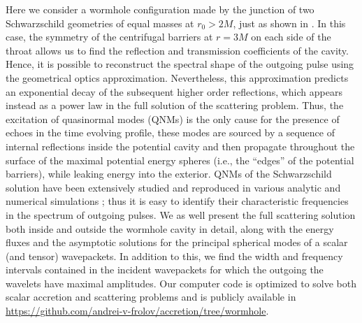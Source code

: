 \documentclass[article,aps,nofootinbib,twocolumn,superscriptaddress]{revtex4-1}
\begin{document}
Here we consider a wormhole configuration made by the junction of two Schwarzschild geometries of equal masses at $r_0>2M$, just as shown in \citep{Cardoso:2016oxy}. In this case, the symmetry of the centrifugal barriers at $r=3M$ on each side of the throat allows us to find the reflection and transmission coefficients of the cavity. Hence, it is possible to reconstruct the spectral shape of the outgoing pulse using the geometrical optics approximation. Nevertheless, this approximation predicts an exponential decay of the subsequent higher order reflections, which appears instead as a power law in the full solution of the scattering problem. Thus, the excitation of quasinormal modes (QNMs) is the only cause for the presence of echoes in the time evolving profile, these modes are sourced by a sequence of internal reflections inside the potential cavity and then propagate throughout the surface of the maximal potential energy spheres (i.e., the ``edges'' of the potential barriers), while leaking energy into the exterior. QNMs of the Schwarzschild solution have been extensively studied and reproduced in various analytic and numerical simulations \citep{Chandrasekhar:1975zza, PhysRevD.46.4179}; thus it is easy to identify their characteristic frequencies in the spectrum of outgoing pulses. We as well present the full scattering solution both inside and outside the wormhole cavity in detail, along with the energy fluxes and the asymptotic solutions for the principal spherical modes of a scalar (and tensor) wavepackets. In addition to this, we find the width and frequency intervals contained in the incident wavepackets for which the outgoing the wavelets have maximal amplitudes. Our computer code is optimized to solve both scalar accretion and scattering problems and is publicly available in \url{https://github.com/andrei-v-frolov/accretion/tree/wormhole}.
\end{document}
